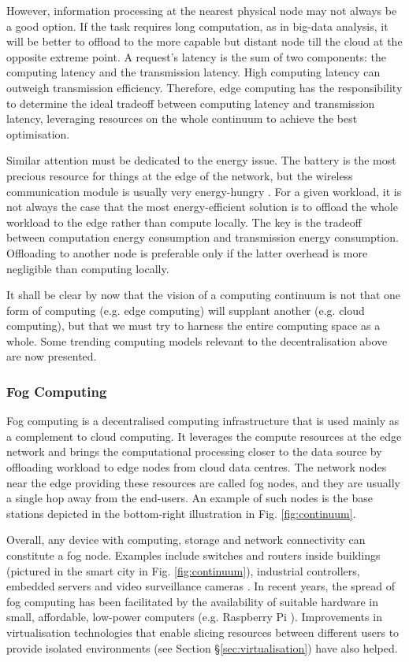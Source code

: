 However, information processing at the nearest physical node may not always be a good option. If the task requires long computation, as in big-data analysis, it will be better to offload to the more capable but distant node till the cloud at the opposite extreme point. A request's latency is the sum of two components: the computing latency and the transmission latency. High computing latency can outweigh transmission efficiency. Therefore, edge computing has the responsibility to determine the ideal tradeoff between computing latency and transmission latency, leveraging resources on the whole continuum to achieve the best optimisation.

Similar attention must be dedicated to the energy issue. The battery is the most precious resource for things at the edge of the network, but the wireless communication module is usually very energy-hungry \cite{edge-computing-vision-challenges}. For a given workload, it is not always the case that the most energy-efficient solution is to offload the whole workload to the edge rather than compute locally. The key is the tradeoff between computation energy consumption and transmission energy consumption. Offloading to another node is preferable only if the latter overhead is more negligible than computing locally.

It shall be clear by now that the vision of a computing continuum is not that one form of computing (e.g. edge computing) will supplant another (e.g. cloud computing), but that we must try to harness the entire computing space as a whole. Some trending computing models relevant to the decentralisation above are now presented.

\subsubsection{Fog Computing}

Fog computing \cite{fog-computing} is a decentralised computing infrastructure that is used mainly as a complement to cloud computing. It leverages the compute resources at the edge network and brings the computational processing closer to the data source by offloading workload to edge nodes from cloud data centres. The network nodes near the edge providing these resources are called fog nodes, and they are usually a single hop away from the end-users. An example of such nodes is the base stations depicted in the bottom-right illustration in Fig. \ref{fig:continuum}.

Overall, any device with computing, storage and network connectivity can constitute a fog node. Examples include switches and routers inside buildings (pictured in the smart city in Fig. \ref{fig:continuum}), industrial controllers, embedded servers and video surveillance cameras \cite{camera-virtualisation}. In recent years, the spread of fog computing has been facilitated by the availability of suitable hardware in small, affordable, low-power computers (e.g. Raspberry Pi \cite{raspberry}).  Improvements in virtualisation technologies that enable slicing resources between different users to provide isolated environments (see Section §\ref{sec:virtualisation}) have also helped.


